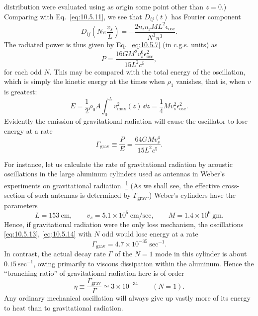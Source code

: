 distribution were evaluated using as origin some point other than \(z=0\).)
Comparing with Eq.~\eqref{eq:10.5.11}, we see that \(D_{ij}(t)\) has Fourier
component
\begin{equation}
  D_{ij}\!\left(N\pi\frac{v_s}{L}\right)
  =
  -\frac{2n_in_jML^2\epsilon_{\mathrm{osc}}}{N^3\pi^3}.
  \tag{10.5.16}\label{eq:10.5.16}
\end{equation}
The radiated power is thus given by Eq.~\eqref{eq:10.5.7} (in c.g.s.
units) as
\begin{equation}
  P
  =
  \frac{16GM^2v_s^6\epsilon_{\mathrm{osc}}^2}{15L^2c^5},
  \tag{10.5.17}\label{eq:10.5.17}
\end{equation}
for each odd \(N\). This may be compared with the total energy of the
oscillation, which is simply the kinetic energy at the times when \(\rho_1\)
vanishes, that is, when \(v\) is greatest:
\[
  E
  =
  \frac12\rho_0A\int_0^Lv_{\max}^2(z)\,\dd z
  =
  \frac14Mv_s^2\epsilon_{\mathrm{osc}}^2.
\]
Evidently the emission of gravitational radiation will cause the oscillator
to lose energy at a rate
\begin{equation}
  \Gamma_{\mathrm{grav}}
  \equiv
  \frac{P}{E}
  =
  \frac{64GMv_s^4}{15L^2c^5}.
  \tag{10.5.18}\label{eq:10.5.18}
\end{equation}

For instance, let us calculate the rate of gravitational radiation by
acoustic oscillations in the large aluminum cylinders used as antennas in
Weber's experiments on gravitational radiation.%
\hyperref[ch10-ref-1]{\textsuperscript{1}}
(As we shall see, the effective cross-section of such antennas is determined
by \(\Gamma_{\mathrm{grav}}\).) Weber's cylinders have the parameters
\[
  L=153\ \mathrm{cm},
  \qquad
  v_s=5.1\times10^5\ \mathrm{cm/sec},
  \qquad
  M=1.4\times10^6\ \mathrm{gm}.
\]
Hence, if gravitational radiation were the only loss mechanism, the
oscillations \eqref{eq:10.5.13}, \eqref{eq:10.5.14} with \(N\) odd would
lose energy at a rate
\begin{equation}
  \Gamma_{\mathrm{grav}}
  =
  4.7\times10^{-35}\ \mathrm{sec}^{-1}.
  \tag{10.5.19}\label{eq:10.5.19}
\end{equation}
In contrast, the actual decay rate \(\Gamma\) of the \(N=1\) mode in this
cylinder is about \(0.15\ \mathrm{sec}^{-1}\), owing primarily to viscous
dissipation within the aluminum. Hence the ``branching ratio'' of
gravitational radiation here is of order
\begin{equation}
  \eta\equiv\frac{\Gamma_{\mathrm{grav}}}{\Gamma}
  \simeq3\times10^{-34}
  \qquad(N=1).
  \tag{10.5.20}\label{eq:10.5.20}
\end{equation}
Any ordinary mechanical oscillation will always give up vastly more of its
energy to heat than to gravitational radiation.

